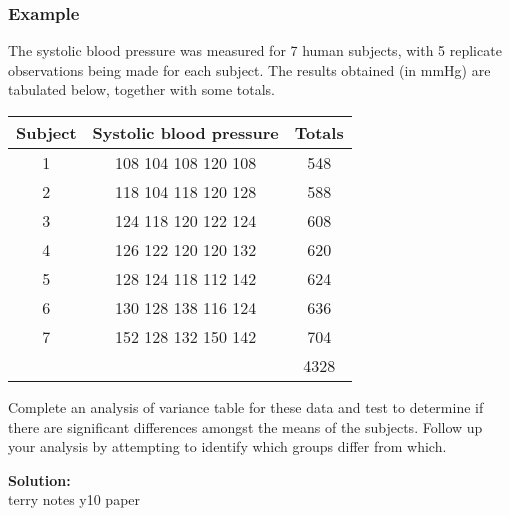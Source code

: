 \documentclass[12pt]{article}
\newenvironment{example}[1][Example:]{\begin{trivlist}
\item[\hskip \labelsep {\bfseries #1}]}{\end{trivlist}}
\begin{document}
\subsubsection{Example}
\begin{example}
The systolic blood pressure was measured for 7 human subjects, with 5 replicate observations being made for each subject. The results obtained (in mmHg) are tabulated below, together with some totals.
\begin{center}
\begin{tabular}{|c|c|c|}
                                  \hline
                                  Subject & Systolic blood pressure & Totals \\ \hline
                                  1 & 108 104 108 120 108 & 548 \\
                                  2 & 118 104 118 120 128 & 588 \\
                                  3 & 124 118 120 122 124 & 608 \\
                                  4 & 126 122 120 120 132 & 620 \\
                                  5 & 128 124 118 112 142 & 624 \\
                                  6 & 130 128 138 116 124 & 636 \\
                                  7 & 152 128 132 150 142 & 704 \\
                                    &                     & 4328 \\
                                  \hline
                                \end{tabular}
\end{center}
Complete an analysis of variance table for these data and test to determine if there are significant differences amongst the means of the subjects. Follow up your analysis by attempting to identify which groups differ from which.
\end{example}

\begin{mdframed}
{\bf Solution:}\\
\textcolor[rgb]{1.00,1.00,1.00}{terry notes y10 paper\lipsum[1-8]}
\end{mdframed}
\end{document}
